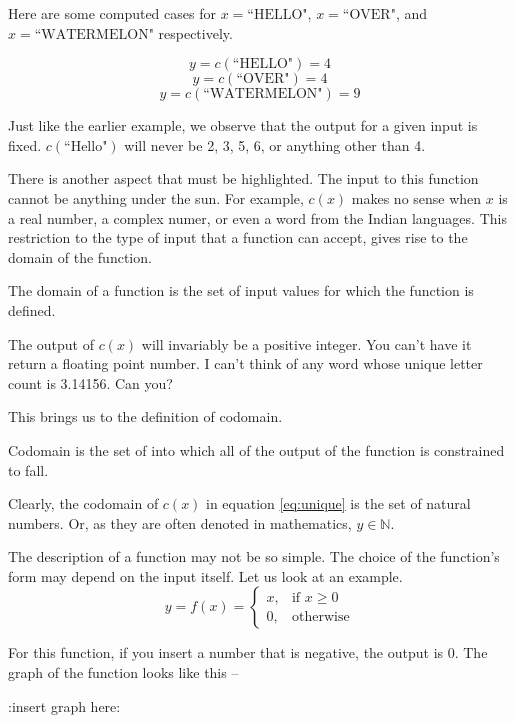Here are some computed cases for $x = \text{``HELLO"}$, $x = \text{``OVER"}$, and $x = \text{``WATERMELON"}$ respectively.

\[
y = c(\text{``HELLO"}) = 4
\]
\[
y = c(\text{``OVER"}) = 4
\]
\[
y = c(\text{``WATERMELON"}) = 9
\]

Just like the earlier example, we observe that the output for a given input is fixed. $c(\text{``Hello"})$ will never be 2, 3, 5, 6, or anything other than 4.

There is another aspect that must be highlighted. The input to this function cannot be anything under the sun. For example, $c(x)$ makes no sense when $x$ is a real number, a complex numer, or even a word from the Indian languages. This restriction to the type of input that a function can accept, gives rise to the domain of the function.

\begin{definition}
The domain of a function is the set of input values for which the function is defined.
\end{definition}

The output of $c(x)$ will invariably be a positive integer. You can't have it return a floating point number. I can't think of any word whose unique letter count is 3.14156. Can you?

This brings us to the definition of codomain.
\begin{definition}[Codomain]
Codomain is the set of into which all of the output of the function is constrained to fall.
\end{definition}

Clearly, the codomain of $c(x)$ in equation  \eqref{eq:unique} is the set of natural numbers. Or, as they are often denoted in mathematics, $y \in \mathbb{N}$.

The description of a function may not be so simple. The choice of the function's form may depend on the input itself. Let us look at an example.
\begin{equation}
    y = f(x)=
\begin{cases}
    x, & \text{if } x\geq 0\\
    0, & \text{otherwise}
\end{cases}
\label{eq:cond}
\end{equation}

For this function, if you insert a number that is negative, the output is 0. The graph of the function looks like this --

:insert graph here:


